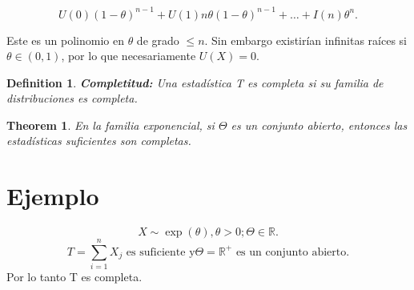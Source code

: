 \documentclass{article}
\newtheorem{mydef}{Definition}
\newtheorem{mythm}{Theorem}
\begin{document}
\[ U{(0)}{(1-\theta)}^{n-1}+U{(1)}n\theta{(1-\theta)}^{n-1}+\ldots+I{(n)}\theta^{n}.\]

Este es un polinomio en $\theta$ de grado $\leq n$. Sin embargo existirían infinitas raíces si $\theta \in {(0,1)}$, por lo que necesariamente $U{(X)}=0$.

\begin{mydef}
\textbf{Completitud: } Una estadística T es completa si su familia de distribuciones es completa.
\end{mydef}

\begin{mythm}
En la familia exponencial, si $\Theta$ es un conjunto abierto, entonces las estadísticas suficientes son completas.
\end{mythm}

\section{Ejemplo}
\[ X\sim \exp{(\theta)},\theta > 0; \Theta \in \mathbb{R}.\]
\[ T=\sum_{i=1}^{n}X_{j} \text{ es suficiente y} \Theta=\mathbb{R}^{+}\text { es un conjunto abierto}.\]
Por lo tanto T es completa.
\end{document}
